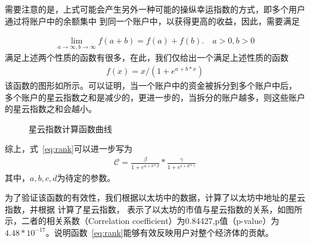 需要注意的是，上式可能会产生另外一种可能的操纵幸运指数的方式，即多个用户通过将账户中的余额集中
到同一个账户中，以获得更高的收益，因此，需要满足

\begin{align}
\lim\limits_{a \to \infty, b\to \infty} f(a+b) = f(a) + f(b).\quad a>0, b>0
\end{align}
满足上述两个性质的函数有很多，在此，我们仅给出一个满足上述性质的函数
\begin{align}
f(x) = x/(1 + e^{a + b*x})
\end{align}
\noindent 该函数的图形如所示。可以证明，当一个账户中的资金被拆分到多个账户中后，
多个账户的星云指数之和是减少的，更进一步的，当拆分的账户越多，则这些账户的星云指数之和会越小。

\begin{figure}
\centering
{}
\caption{星云指数计算函数曲线}
\label{fig-nr}
\end{figure}

\vspace{1em}
综上，式~\ref{eq:rank}可以进一步写为
\begin{align}
\mathcal{C} =  \frac{\beta}{1+e^{a + b * \beta}} * \frac{\gamma}{1+e^{c + d * \gamma}}
\end{align}
\noindent 其中，$a, b, c, d$为待定的参数。

为了验证该函数的有效性，我们根据以太坊中的数据，计算了以太坊中地址的星云指数，并根据{\color{red} 计算了星云指数}，
表示了以太坊的市值与星云指数的关系，如图所示，二者的相关系数（Correlation coefficient）为0.84427,p值（p-value）为$4.48*10^{-17}$。说明函数~\ref{eq:rank}能够有效反映用户对整个经济体的贡献。


